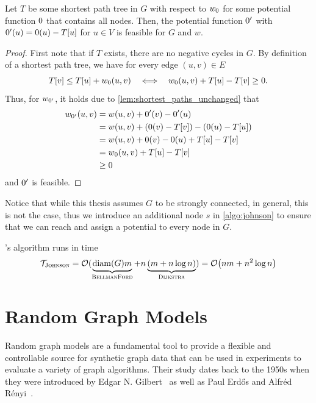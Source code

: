 \begin{lemma}\label{lem:shortest_paths_are_feasible}
  Let $T$ be some shortest path tree in $G$ with respect to $\wpot$ for some potential function $\pot$ that contains all nodes.
  Then, the potential function $\pot'$ with $\pot'(u) = \pot(u) - T[u]$ for $u \in V$ is feasible for $G$ and $w$.
\end{lemma}
\begin{proof}
  First note that if $T$ exists, there are no negative cycles in $G$.
  By definition of a shortest path tree, we have for every edge $(u, v) \in E$ \[
    T[v] \leq T[u] + \wpot(u, v) \quad\Longleftrightarrow\quad \wpot(u, v) + T[u] - T[v] \geq 0.
  \]
  Thus, for $w_{\pot'}$, it holds due to \cref{lem:shortest_paths_unchanged} that \begin{align*}
    w_{\pot'}(u, v) &= w(u, v) + \pot'(v) - \pot'(u) \\ 
                    &= w(u, v) + \left(\pot(v) - T[v]\right) - \left(\pot(u) - T[u]\right) \\
                    &= w(u, v) + \pot(v) - \pot(u) + T[u] - T[v] \\
                    &= \wpot(u, v) + T[u] - T[v] \\
                    &\geq 0
  \end{align*} and $\pot'$ is feasible.
\end{proof}

\noindent Notice that while this thesis assumes $G$ to be strongly connected, in general, this is not the case, thus we introduce an additional node $s$ in \cref{algo:johnson} to ensure that we can reach and assign a potential to every node in $G$.

\begin{observation}\label{obs:johnson_runtime}
  \algjs's algorithm runs in time \[
    \mathcal{T}_{\textsc{Johnson}} = \mathcal O(\underbrace{\mathrm{diam}(G)m}_{\textsc{BellmanFord}} + n\underbrace{\left(m+ n\log n\right)}_{\textsc{Dijkstra}}) = \mathcal O\!\left(nm + n^2\log n\right)
  \]
\end{observation}





\section{Random Graph Models}\label{sec:random_graphs}
Random graph models are a fundamental tool to provide a flexible and controllable source for synthetic graph data that can be used in experiments to evaluate a variety of graph algorithms.
Their study dates back to the 1950s when they were introduced by Edgar N. Gilbert~\cite{gilbert1959random} as well as Paul Erdős and Alfréd Rényi~\cite{erdds1959random}.

